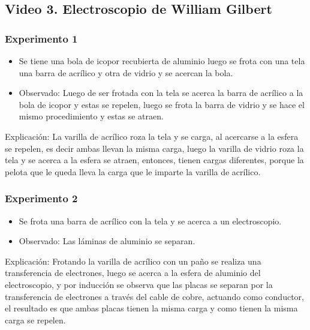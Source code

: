 \documentclass[letterpaper, 12pt]{report}
\begin{document}
\subsection{Video 3. Electroscopio de William Gilbert}

\subsubsection{Experimento 1}

\begin{itemize}
	\item Se tiene una bola de icopor recubierta de aluminio luego se
	      frota con una tela una barra de acrílico y otra de vidrio y se
	      acercan la bola.

	\item Observado: Luego de ser frotada con la tela se acerca la barra de
	      acrílico a la bola de icopor y estas se repelen, luego se frota la
	      barra de vidrio y se hace el mismo procedimiento y estas se atraen.
\end{itemize}

Explicación: La varilla de acrílico roza la tela y se carga, al acercarse
a la esfera se repelen, es decir ambas llevan la misma carga, luego la
varilla de vidrio roza la tela y se acerca a la esfera se atraen, entonces,
tienen cargas diferentes, porque la pelota que le queda lleva la carga que
le imparte la varilla de acrílico.~\cite{LeyCargasElectricas}

\subsubsection{Experimento 2}

\begin{itemize}
	\item Se frota una barra de acrílico con la tela y se acerca a un
	      electroscopio.

	\item Observado: Las láminas de aluminio se separan.
\end{itemize}

Explicación: Frotando la varilla de acrílico con un paño se realiza una
transferencia de electrones, luego se acerca a la esfera de aluminio del
electroscopio, y por inducción se observa que las placas se separan por
la transferencia de electrones a través del cable de cobre, actuando como
conductor, el resultado es que ambas placas tienen la misma carga y como
tienen la misma carga se repelen.~\cite{GenerarCargaElectrica}
\end{document}

